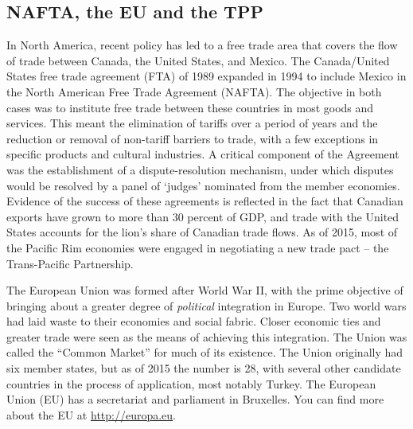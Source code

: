 \newhtmlpage

\subsection*{NAFTA, the EU and the TPP}

In North America, recent policy has led to a free trade area that covers the
flow of trade between Canada, the United States, and Mexico. The
Canada/United States free trade agreement (FTA) of 1989 expanded in 1994 to
include Mexico in the North American Free Trade Agreement (NAFTA). The
objective in both cases was to institute free trade between these countries
in most goods and services. This meant the elimination of tariffs over a
period of years and the reduction or removal of non-tariff barriers to
trade, with a few exceptions in specific products and cultural industries. A
critical component of the Agreement was the establishment of a dispute-resolution 
mechanism, under which disputes would be resolved by a panel of
`judges' nominated from the member economies. Evidence of the success of
these agreements is reflected in the fact that Canadian exports have grown
to more than 30 percent of GDP, and trade with the United States accounts
for the lion's share of Canadian trade flows. As of 2015, most of the
Pacific Rim economies were engaged in negotiating a new trade pact -- the
Trans-Pacific Partnership.

The European Union was formed after World War II, with the prime objective
of bringing about a greater degree of \textit{political} integration in
Europe. Two world wars had laid waste to their economies and social fabric.
Closer economic ties and greater trade were seen as the means of achieving
this integration. The Union was called the ``Common
Market'' for much of its existence. The Union originally
had six member states, but as of 2015 the number is 28, with several other
candidate countries in the process of application, most notably Turkey. The
European Union (EU) has a secretariat and parliament in Bruxelles. You can
find more about the EU at \url{http://europa.eu}.